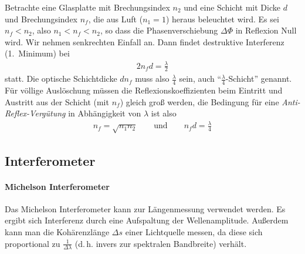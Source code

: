 \begin{enumerate}[a)]
  Betrachte eine Glasplatte mit Brechungsindex $n_2$ und eine Schicht
  mit Dicke $d$ und Brechungsindex $n_f$, die aus Luft ($n_1=1$) heraus
  beleuchtet wird. Es sei $n_f<n_2$, also $n_1<n_f<n_2$, so dass die
  Phasenverschiebung $\Delta\Phi$ in Reflexion Null wird.
  Wir nehmen senkrechten Einfall an. Dann findet destruktive
  Interferenz (1.~Minimum) bei
  \begin{gather*}
    2n_fd = \frac{\lambda}{2}
  \end{gather*}
  statt. Die optische Schichtdicke $dn_f$ muss also
  $\frac{\lambda}{4}$ sein, auch \enquote{$\frac{\lambda}{4}$-Schicht}
  genannt.
  Für völlige Auslöschung müssen die Reflexionskoeffizienten beim
  Eintritt und Austritt aus der Schicht (mit $n_f$) gleich groß
  werden, die Bedingung für eine 
  \emph{Anti-Reflex-Vergütung} in
  Abhängigkeit von $\lambda$ ist also
  \begin{gather*}
    n_f = \sqrt{n_1n_2} 
    \qquad\text{und}\qquad
    n_fd = \frac{\lambda}{4}
  \end{gather*}

\end{enumerate}


\subsection{Interferometer}
\paragraph{Michelson Interferometer}%

Das Michelson Interferometer kann zur Längenmessung verwendet werden.
Es ergibt sich Interferenz durch eine Aufspaltung der Wellenamplitude.
Außerdem kann man die Kohärenzlänge $\Delta s$ einer Lichtquelle
messen, da diese sich proportional zu $\frac{1}{\Delta\lambda}$
(d.\,h. invers zur spektralen Bandbreite) verhält.






